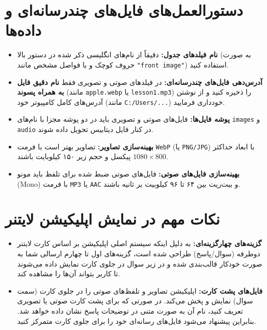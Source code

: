 \documentclass[12pt]{article}
\begin{document}
\section{دستورالعمل‌های فایل‌های چندرسانه‌ای و داده‌ها}
\begin{itemize}
    \item \textbf{نام فیلدهای جدول:} دقیقاً از نام‌های انگلیسی ذکر شده در دستور بالا (به صورت حروف کوچک و با فواصل مشخص مانند \verb|"front image"|) استفاده کنید.
    \item \textbf{آدرس‌دهی فایل‌های چندرسانه‌ای:} در فیلدهای صوتی و تصویری فقط \textbf{نام دقیق فایل به همراه پسوند} (مانند \verb|apple.webp| یا \verb|lesson1.mp3|) را ذخیره کنید و از نوشتن آدرس‌های کامل کامپیوتر خود (مانند \verb|C:/Users/...|) خودداری فرمایید.
    \item \textbf{پوشه فایل‌ها:} فایل‌های صوتی و تصویری باید در دو پوشه مجزا با نام‌های \verb|images| و \verb|audio| در کنار فایل دیتابیس تحویل داده شوند.
    \item \textbf{بهینه‌سازی تصاویر:} تصاویر بهتر است با فرمت \verb|WebP| (یا \verb|PNG/JPG|) با ابعاد حداکثر $1080 \times 800$ پیکسل و حجم زیر ۱۵۰ کیلوبایت باشند.
    \item \textbf{بهینه‌سازی فایل‌های صوتی:} فایل‌های صوتی ضبط شده برای تلفظ باید مونو (Mono) با فرمت \verb|MP3| یا \verb|AAC| و بیت‌ریت بین ۶۴ تا ۹۶ کیلوبیت بر ثانیه باشند.
\end{itemize}

\section{نکات مهم در نمایش اپلیکیشن لایتنر}
\begin{itemize}
    \item \textbf{گزینه‌های چهارگزینه‌ای:} به دلیل اینکه سیستم اصلی اپلیکیشن بر اساس کارت لایتنر دوطرفه (سوال/پاسخ) طراحی شده است، گزینه‌های اول تا چهارم ارسالی شما به صورت خودکار قالب‌بندی شده و در زیر سوال در جلوی کارت نمایش داده می‌شوند تا کاربر بتواند آن‌ها را مشاهده کند.
    \item \textbf{فایل‌های پشت کارت:} اپلیکیشن تصاویر و تلفظ‌های صوتی را در جلوی کارت (سمت سوال) نمایش و پخش می‌کند. در صورتی که برای پشت کارت صوتی یا تصویری تعریف کنید، نام آن به صورت متنی در توضیحات پاسخ نشان داده خواهد شد. بنابراین پیشنهاد می‌شود فایل‌های رسانه‌ای خود را برای جلوی کارت متمرکز کنید.
\end{itemize}
\end{document}
